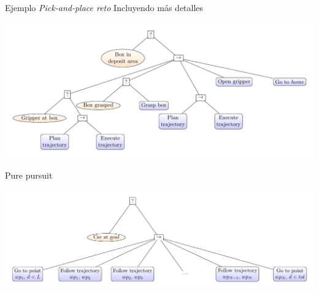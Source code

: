 \documentclass[presentation,aspectratio=169]{beamer}
\begin{document}
\begin{frame}[label={sec:org1de7139}]{Ejemplo \emph{Pick-and-place reto}}
Incluyendo más detalles

\begin{center}
  \includegraphics[width=\linewidth]{../figures/bt-manipulator-task-detailed}
\end{center}
\end{frame}


\begin{frame}[label={sec:org87043d6}]{Pure pursuit}
\begin{center}
  \includegraphics[width=\linewidth]{../figures/bt-pure-pursuit}
\end{center}
\end{frame}
\end{document}
